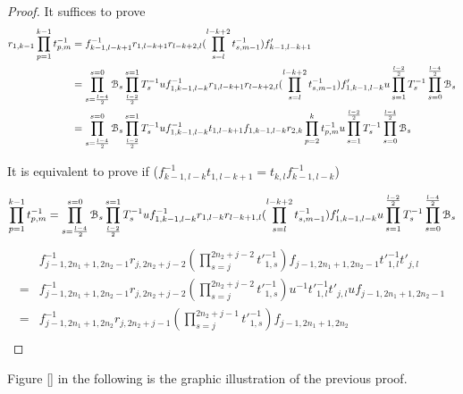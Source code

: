 \documentclass{amsart}
\begin{document}
\begin{proof}
It suffices to prove
\[
\begin{aligned}
r_{1,k-1}\prod^{k-1}_{p=1}t^{-1}_{p,m}&=f^{-1}_{k-1,l-k+1}r_{1,l-k+1}r_{l-k+2,l}(\prod^{l-k+2}_{s=l} t^{-1}_{s,m-1})f'_{k-1,l-k+1}\\
&=\prod^{s=0}_{s=\frac{l-4}{2}}\mathcal{B}_s\prod^{s=1}_{\frac{l-2}{2}}T^{-1}_suf^{-1}_{1,k-1,l-k}r_{1,l-k+1}r_{l-k+2,l}(\prod^{l-k+2}_{s=l} t^{-1}_{s,m-1})f'_{1,k-1,l-k}u\prod^{\frac{l-2}{2}}_{s=1}T^{-1}_s\prod^{\frac{l-4}{2}}_{s=0}\mathcal{B}_s\\
&=\prod^{s=0}_{s=\frac{l-4}{2}}\mathcal{B}_s\prod^{s=1}_{\frac{l-2}{2}}T^{-1}_suf^{-1}_{1,k-1,l-k}t_{1,l-k+1}f_{1,k-1,l-k}r_{2,k}\prod^{k}_{p=2}t^{-1}_{p,m}u\prod^{\frac{l-2}{2}}_{s=1}T^{-1}_s\prod^{\frac{l-4}{2}}_{s=0}\mathcal{B}_s
\end{aligned}
\]

It is equivalent to prove if ($f^{-1}_{k-1,l-k}t_{1,l-k+1}=t_{k,l}f^{-1}_{k-1,l-k}$)

\[
\begin{aligned}
\prod^{k-1}_{p=1}t^{-1}_{p,m}=\prod^{s=0}_{s=\frac{l-4}{2}}\mathcal{B}_s\prod^{s=1}_{\frac{l-2}{2}}T^{-1}_suf^{-1}_{1,k-1,l-k}r_{1,l-k}r_{l-k+1,l}(\prod^{l-k+2}_{s=l} t^{-1}_{s,m-1})f'_{1,k-1,l-k}u\prod^{\frac{l-2}{2}}_{s=1}T^{-1}_s\prod^{\frac{l-4}{2}}_{s=0}\mathcal{B}_s   
\end{aligned}
\]
\[
\begin{aligned}
&f^{-1}_{j-1,2n_1+1,2n_2-1}r_{j,2n_2+j-2}(\prod^{2n_2+j-2}_{s=j} t'^{-1}_{1,s})f_{j-1,2n_1+1,2n_2-1}t'^{-1}_{1,l}
t'_{j,l}\\
=&f^{-1}_{j-1,2n_1+1,2n_2-1}r_{j,2n_2+j-2}(\prod^{2n_2+j-2}_{s=j} t'^{-1}_{1,s})u^{-1}t'^{-1}_{1,l}
t'_{j,l}uf_{j-1,2n_1+1,2n_2-1}\\
=&f^{-1}_{j-1,2n_1+1,2n_2}r_{j,2n_2+j-1}(\prod^{2n_2+j-1}_{s=j} t'^{-1}_{1,s})f_{j-1,2n_1+1,2n_2}\\
\end{aligned}
\]
\end{proof}

Figure \ref{} in the following is the graphic illustration of the previous proof.
\fi
\end{document}

